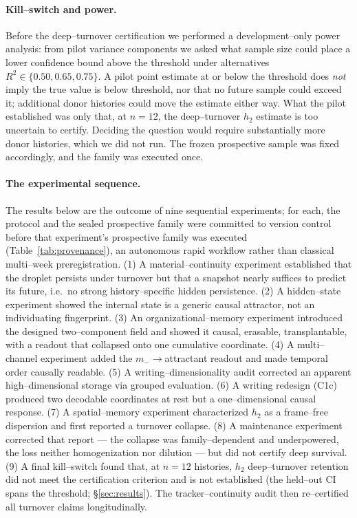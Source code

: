 \documentclass[11pt]{article}
\begin{document}
\paragraph{Kill--switch and power.} Before the deep--turnover certification we performed a development--only power
analysis: from pilot variance components we asked what sample size could place a lower confidence bound above the
threshold under alternatives $R^2\in\{0.50,0.65,0.75\}$. A pilot point estimate at or below the threshold does \emph{not} imply the true value is below threshold, nor that no future sample could exceed it; additional donor histories could move the estimate either way. What the pilot established was only that, at $n=12$, the deep--turnover $h_2$ estimate is too uncertain to certify. Deciding the question would require substantially more donor histories, which we did not run. The frozen
prospective sample was fixed accordingly, and the family was executed once. \paragraph{The experimental sequence.} The results below are the outcome of nine sequential experiments; for each, the protocol and the sealed prospective family were committed to version control before that experiment's prospective family was executed (Table~\ref{tab:provenance}), an autonomous rapid workflow rather than classical multi--week preregistration. (1) A material--continuity experiment established that the droplet persists under turnover but that a snapshot nearly suffices to predict its future, i.e.\ no strong history--specific hidden persistence. (2) A hidden--state experiment showed the internal state is a generic causal attractor, not an individuating fingerprint. (3) An organizational--memory experiment introduced the designed two--component field and showed it causal, erasable, transplantable, with a readout that collapsed onto one cumulative coordinate. (4) A multi--channel experiment added the $m_-\!\to$attractant readout and made temporal order causally readable. (5) A writing--dimensionality audit corrected an apparent high--dimensional storage via grouped evaluation. (6) A writing redesign (C1c) produced two decodable coordinates at rest but a one--dimensional causal response. (7) A spatial--memory experiment characterized $h_2$ as a frame--free dispersion and first reported a turnover collapse. (8) A maintenance experiment corrected that report --- the collapse was family--dependent and underpowered, the loss neither homogenization nor dilution --- but did not certify deep survival. (9) A final kill--switch found that, at $n=12$ histories, $h_2$ deep--turnover retention did not meet the certification criterion and is not established (the held--out CI spans the threshold; §\ref{sec:results}). The tracker--continuity audit then re--certified all turnover claims longitudinally.
\end{document}
